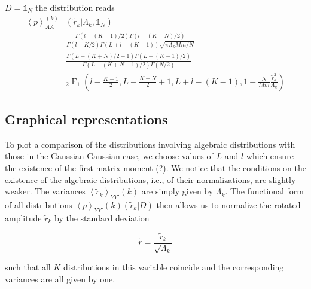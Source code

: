 $D = \mathbb{1}_{N}$ the distribution reads
\begin{equation}
    \begin{split}
    \left\langle p \right\rangle_{AA}^{\left(k\right)} &
    \left(\tilde{r}_{k} \vert \Lambda_{k}, \mathbb{1}_{N}\right) = \\
    &\frac{\Gamma\left(l - \left(K - 1 \right) / 2\right)
    \Gamma\left(l - \left(K - N\right) / 2\right)}
    {\Gamma\left(l - K/ 2\right) \Gamma\left(L + l - \left(K - 1\right) \right)
    \sqrt{\pi \Lambda_{k}Mm/N}} \\
    &\frac{\Gamma\left(L - \left(K + N \right) / 2 + 1\right)
    \Gamma\left(L - \left(K - 1\right) / 2\right)}
    {\Gamma\left(L - \left(K + N - 1\right) / 2\right) \Gamma\left(N / 2\right)
    } \\
    & _{2}\operatorname{F}_{1} \left(l - \frac{K - 1}{2}, L -\frac{K + N}{2}+1,
    L + l - \left(K - 1\right), 1 - \frac{N}{Mm} \frac{\tilde{r}^{2}_{k}}
    {\Lambda_{k}}\right)
    \end{split}
\end{equation}

\subsection{Graphical representations}\label{subsec:graphical_distributions}

To plot a comparison of the distributions involving algebraic distributions
with those in the Gaussian-Gaussian case, we choose values of $L$ and $l$ which
ensure the existence of the first matrix moment (?). We notice that the
conditions on the existence of the algebraic distributions, i.e., of their
normalizations, are slightly weaker. The variances $\left\langle \tilde{r}_{k} \right\rangle_{YY'}{\left(k\right)}$
are simply given by $\Lambda_{k}$. The functional form of all distributions
$\left\langle p \right\rangle_{YY'}{\left(k\right)} \left(\tilde{r}_{k} \vert D \right)$
then allows us to normalize the rotated amplitude $\tilde{r}_k$ by the standard
deviation

\begin{equation}
    \tilde{r} = \frac{\tilde{r}_{k}}{\sqrt{\Lambda_{k}}}
\end{equation}

such that all $K$ distributions in this variable coincide and the corresponding
variances are all given by one.